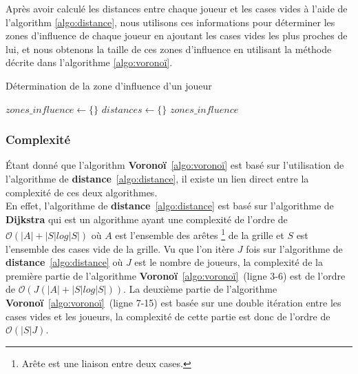 Après avoir calculé les distances entre chaque joueur et les cases vides à l'aide de l'algorithm \ref{algo:distance}, 
nous utilisons ces informations pour déterminer les zones d'influence de chaque joueur en ajoutant les cases vides les plus 
proches de lui, et nous obtenons la taille de ces zones d'influence en utilisant la méthode décrite dans l'algorithme \ref{algo:voronoï}.\\

\begin{algorithm}[H]
	\caption{Détermination de la zone d'influence d'un joueur}
	\label{algo:voronoï}
	\DontPrintSemicolon
	$zones\_influence \gets \{\}$\;
	$distances \gets \{\}$\;
	\Return $zones\_influence$\;
\end{algorithm}

\tocless\subsubsection{Complexité}
Étant donné que l'algorithm \textbf{Voronoï}~\ref{algo:voronoï} est basé sur l'utilisation de l'algorithme de \textbf{distance}~\ref{algo:distance}, 
il existe un lien direct entre la complexité de ces deux algorithmes. \\

En effet, l'algorithme de \textbf{distance}~\ref{algo:distance} est basé sur l'algorithme de \textbf{Dijkstra} qui est un algorithme ayant une complexité
de l'ordre de $\mathcal{O}{(|A| + |S|log|S|)}$ où $A$ est l'ensemble des arêtes \footnote{Arête est une liaison entre deux cases.} de la grille et 
$S$ est l'ensemble des cases vide de la grille. Vu que l'on itère $J$ fois sur l'algorithme de \textbf{distance}~\ref{algo:distance} où $J$ est le nombre de joueurs,
la complexité de la première partie de l'algorithme \textbf{Voronoï}~\ref{algo:voronoï}~(ligne 3-6) est de l'ordre de $\mathcal{O}{(J(|A| + |S|log|S|))}$. La deuxième partie de l'algorithme
\textbf{Voronoï}~\ref{algo:voronoï}~(ligne 7-15) est basée sur une double itération entre les cases vides et les joueurs, la complexité de cette partie est donc de l'ordre de
$\mathcal{O}{(|S|J)}$. \\

